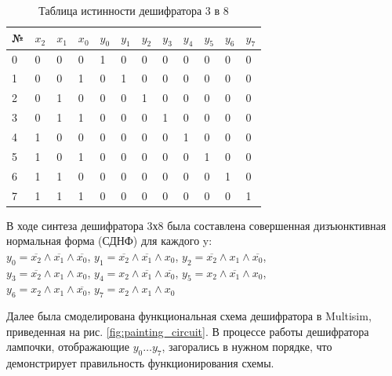 \documentclass[14pt, a4paper]{extarticle}
\newcommand{\tab}{\hspace{12.5mm}}
\begin{document}
\begin{table}[h!]
	\centering
	\begin{tabularx}{\textwidth}{|Y|Y|Y|Y|Y|Y|Y|Y|Y|Y|Y|Y|}
		\hline
		№ & $x_2$ & $x_1$ & $x_0$ & $y_0$ & $y_1$ & $y_2$ & $y_3$ & $y_4$ & $y_5$ & $y_6$ & $y_7$ \\  & 0     & 0     & 0     & 1     & 0     & 0     & 0     & 0     & 0     & 0     & 0     \\  & 0     & 0     & 1     & 0     & 1     & 0     & 0     & 0     & 0     & 0     & 0     \\  & 0     & 1     & 0     & 0     & 0     & 1     & 0     & 0     & 0     & 0     & 0     \\  & 0     & 1     & 1     & 0     & 0     & 0     & 1     & 0     & 0     & 0     & 0     \\  & 1     & 0     & 0     & 0     & 0     & 0     & 0     & 1     & 0     & 0     & 0     \\  & 1     & 0     & 1     & 0     & 0     & 0     & 0     & 0     & 1     & 0     & 0     \\  & 1     & 1     & 0     & 0     & 0     & 0     & 0     & 0     & 0     & 1     & 0     \\  & 1     & 1     & 1     & 0     & 0     & 0     & 0     & 0     & 0     & 0     & 1     \\ \hline
	\end{tabularx}
	\caption{Таблица истинности дешифратора 3 в 8}
	\label{tab:decoder_tabularx}
\end{table}

\noindent В ходе синтеза дешифратора 3х8 была составлена совершенная дизъюнктивная нормальная форма (СДНФ) для каждого y:\\
\noindent $y_0 = \overline{x_2} \wedge \overline{x_1} \wedge \overline{x_0}$, \tab $y_1 = \overline{x_2} \wedge \overline{x_1} \wedge x_0$, \tab $y_2 = \overline{x_2} \wedge x_1 \wedge \overline{x_0}$, \tab \\$y_3 = \overline{x_2} \wedge x_1 \wedge x_0$, \tab $y_4 = x_2 \wedge \overline{x_1} \wedge \overline{x_0}$, \tab $y_5 = x_2 \wedge \overline{x_1} \wedge x_0$, \tab \\$y_6 = x_2 \wedge x_1 \wedge \overline{x_0}$, \tab $y_7 = x_2 \wedge x_1 \wedge x_0$

Далее была смоделирована функциональная схема дешифратора в Multisim, приведенная на рис. \ref{fig:painting_circuit}. В процессе работы дешифратора лампочки, отображающие $y_0 \dots y_7$, загорались в нужном порядке, что демонстрирует правильность функционирования схемы.
\end{document}
